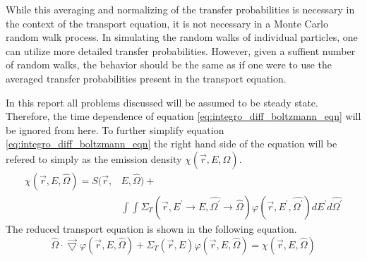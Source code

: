 While this averaging and normalizing of the transfer probabilities is necessary
in the context of the transport equation, it is not necessary in a Monte Carlo
random walk process. In simulating the random walks of individual particles, 
one can utilize more detailed transfer probabilities. However, given a suffient
number of random walks, the behavior should be the same as if one were to use
the averaged transfer probabilities present in the transport equation. 

In this report all problems discussed will be assumed to be steady state. 
Therefore, the time dependence of equation \ref{eq:integro_diff_boltzmann_eqn} 
will be ignored from here. To further simplify equation 
\ref{eq:integro_diff_boltzmann_eqn} the right hand side of the equation will be 
refered to simply as the emission density $\chi(\vec{r},E,\hat{\Omega})$.
\begin{equation}
  \begin{split}
    \chi(\vec{r},E,\hat{\Omega}) = S(\vec{r},&E,\hat{\Omega}) + \\
    & \int\int \Sigma_T(\vec{r},E^{'} \to E,\hat{\Omega^{'}} \to \hat{\Omega})
    \varphi(\vec{r},E^{'},\hat{\Omega^{'}}) dE^{'}d\hat{\Omega^{'}}
  \end{split}
  \label{eq:emission_density}
\end{equation}
The reduced transport equation is shown in the following equation.
\begin{equation}
  \hat{\Omega} \cdot \vec{\bigtriangledown} \varphi(\vec{r},E,\hat{\Omega})
  + \Sigma_T(\vec{r},E) \varphi(\vec{r},E,\hat{\Omega}) =  
 \chi(\vec{r},E,\hat{\Omega})
  \label{eq:reduced_transport_eqn}
\end{equation}

